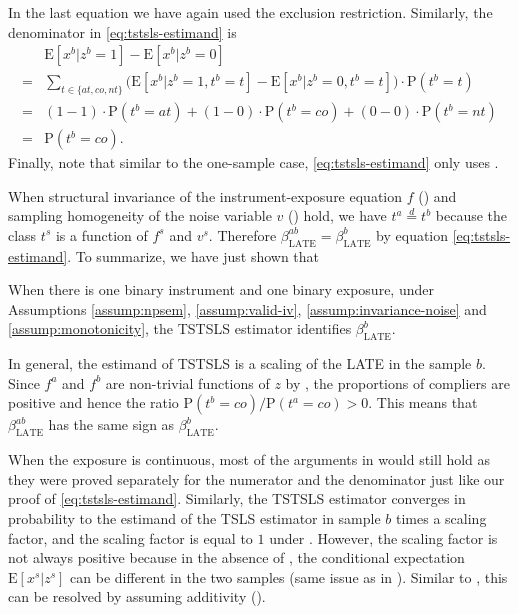 \documentclass[preprint]{imsart}
\begin{document}
In the last equation we have again used the exclusion
restriction. Similarly, the denominator in \eqref{eq:tstsls-estimand}
is
\[
\begin{split}
  &\mathrm{E}[x^b|z^b=1] - \mathrm{E}[x^b|z^b = 0] \\
  =&\sum_{t \in \{at,co,nt\}} \big(\mathrm{E}[x^b|z^b=1,t^b=t] -
  \mathrm{E}[x^b|z^b = 0,t^b=t]\big) \cdot \mathrm{P}(t^b=t) \\
  =& (1 - 1) \cdot \mathrm{P}(t^b = at) + (1 - 0) \cdot
  \mathrm{P}(t^b=co) + (0 - 0) \cdot \mathrm{P}(t^b=nt) \\
  =& \mathrm{P}(t^b = co).
\end{split}
\]
Finally, note that similar to the one-sample case,
\eqref{eq:tstsls-estimand} only uses
.

When
structural invariance of the instrument-exposure equation $f$
() and sampling homogeneity of the noise variable $v$
() hold, we have $t^a
\overset{d}{=} t^b$ because the class $t^s$ is a function of
$f^s$ and $v^s$. Therefore $\beta_{\mathrm{LATE}}^{ab} = \beta_{\mathrm{LATE}}^b$
by equation \eqref{eq:tstsls-estimand}. To summarize, we have just
shown that
\begin{proposition} \label{prop:3}
  When there is one binary instrument and one binary exposure, under
  Assumptions \ref{assump:npsem}, \ref{assump:valid-iv},
  \ref{assump:invariance-noise} and \ref{assump:monotonicity}, the TSTSLS estimator identifies $\beta^b_{\text{LATE}}$.
\end{proposition}


In general, the estimand of TSTSLS is a
scaling of the LATE in the sample $b$. Since $f^a$ and $f^b$ are
non-trivial functions of $z$ by , the
proportions of compliers are positive and hence the ratio $\mathrm{P}(t^b =
co)/\mathrm{P}(t^a = co) > 0$. This means that
$\beta_{\mathrm{LATE}}^{ab}$ has the same sign as
$\beta_{\mathrm{LATE}}^b$.

When the exposure is continuous, most of the arguments in
\citet{angrist2000interpretation} would still hold as they were proved
separately for the numerator and the denominator just like our proof of
\eqref{eq:tstsls-estimand}. Similarly, the TSTSLS estimator
converges in probability to the estimand of the TSLS estimator in
sample $b$ times a scaling factor, and the scaling factor is equal to
$1$ under . However,
the scaling factor is not always positive because in the absence of
, the
conditional expectation $\mathrm{E}[x^s|z^s]$ can be different in the
two samples (same issue as in ). Similar to
, this can be resolved by assuming
additivity ().
\end{document}

